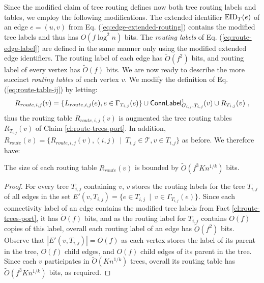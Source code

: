 Since the modified claim of tree routing defines now both tree routing labels and tables, we employ the following modifications. The extended identifier $\operatorname{EID}_T(e)$ of an edge $e=(u,v)$ from Eq. (\ref{eq:edge-extended-routing})
contains the modified tree labels and thus has $O(f\log^2 n)$ bits.
The \emph{routing labels} of Eq. (\ref{eq:route-edge-label}) are defined in the same manner only using the modified extended edge identifiers. The routing label of each edge has $\widetilde{O}(f^2)$ bits, and routing label of every vertex has $\widetilde{O}(f)$ bits. 
We are now ready to describe the more succinct \emph{routing tables} of each vertex $v$. We modify the definition of Eq. (\ref{eq:route-table-ij}) by letting:
\begin{equation*}\label{eq:route-table-ij-mod}
R_{route,i,j}(v)=\{L_{route,i,j}(e), e \in \Gamma_{T_{i,j}}(e)\} \cup \mathsf{ConnLabel}^1_{G_{i,j},T_{i,j}}(v) \cup R_{T_{i,j}}(v)~,
\end{equation*}
thus the routing table $R_{route,i,j}(v)$ is augmented the tree routing tables $R_{T_{i,j}}(v)$ of Claim \ref{cl:route-trees-port}. In addition, $R_{route}(v)=\{R_{route,i,j}(v), (i,j) ~\mid~ T_{i,j} \in \mathcal{T}, v\in T_{i,j}\}$ as before.
We therefore have:
\begin{claim}\label{cl:route-balance-table}
The size of each routing table $R_{route}(v)$ is bounded by $\widetilde{O}(f^3 K n^{1/k})$ bits. %
\end{claim}
\begin{proof}
For every tree $T_{i,j}$ containing $v$, $v$ stores the routing labels for the tree $T_{i,j}$ of all edges in the set $E'(v,T_{i,j})=\{e \in T_{i,j} ~\mid~ v \in  \Gamma_{T_{i,j}}(e)\}$. Since each connectivity label of an edge contains the modified tree labels from Fact \ref{cl:route-trees-port}, it has $\widetilde{O}(f)$ bits, and as the routing label for $T_{i,j}$ contains $O(f)$ copies of this label, overall each routing label of an edge has $\widetilde{O}(f^2)$ bits. Observe that $|E'(v,T_{i,j})|=O(f)$ as each vertex stores the label of its parent in the tree, $O(f)$ child edges, and $O(f)$ child edges of its parent in the tree. Since each $v$ participates in $\widetilde{O}(K n^{1/k})$ trees, overall its routing table has $\widetilde{O}(f^3 K n^{1/k})$ bits, as required. 
\end{proof}

